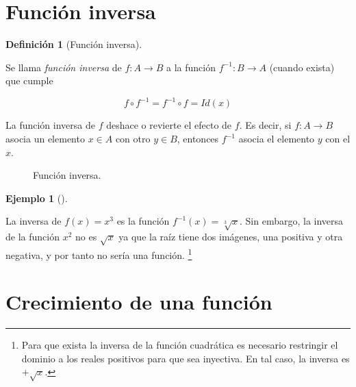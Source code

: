 \documentclass[
  a4paper,
]{scrreport}
\theoremstyle{plain}
\theoremstyle{plain}
\theoremstyle{definition}
\newtheorem{definition}{Definición}[chapter]
\theoremstyle{plain}
\theoremstyle{definition}
\newtheorem{example}{Ejemplo}[chapter]
\theoremstyle{remark}
\begin{document}
\hypertarget{funciuxf3n-inversa-1}{%
\section{Función inversa}\label{funciuxf3n-inversa-1}}

\leavevmode{}%
\begin{definition}[Función inversa]\label{def-funcion-inversa}

Se llama \emph{función inversa} de \(f:A\rightarrow B\) a la función
\(f^{-1}:B\rightarrow A\) (cuando exista) que cumple

\[f\circ f^{-1}=f^{-1}\circ f=Id(x)\]

\end{definition}

La función inversa de \(f\) deshace o revierte el efecto de \(f\). Es
decir, si \(f:A\rightarrow B\) asocia un elemento \(x\in A\) con otro
\(y\in B\), entonces \(f^{-1}\) asocia el elemento \(y\) con el \(x\).

\begin{figure}

{\centering 



}

\caption{Función inversa.}

\end{figure}

\leavevmode{}%
\begin{example}[]\label{exm-funcion-inversa}

La inversa de \(f(x)=x^3\) es la función \(f^{-1}(x)=\sqrt[3]{x}.\) Sin
embargo, la inversa de la función \(x^2\) no es \(\sqrt{x}\) ya que la
raíz tiene dos imágenes, una positiva y otra negativa, y por tanto no
sería una función. \footnote{Para que exista la inversa de la función
  cuadrática es necesario restringir el dominio a los reales positivos
  para que sea inyectiva. En tal caso, la inversa es \(+\sqrt{x}\).}

\end{example}

\hypertarget{crecimiento-de-una-funciuxf3n}{%
\section{Crecimiento de una
función}\label{crecimiento-de-una-funciuxf3n}}
\end{document}
